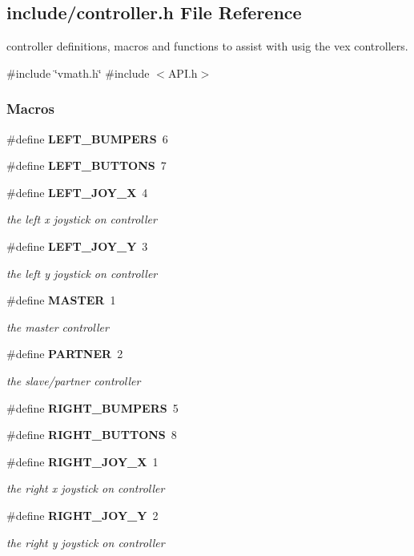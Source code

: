 \subsection{include/controller.h File Reference}
\label{a00011}


controller definitions, macros and functions to assist with usig the vex controllers.  


{\ttfamily \#include \char`\"{}vmath.\+h\char`\"{}}\newline
{\ttfamily \#include $<$A\+P\+I.\+h$>$}\newline
\subsubsection*{Macros}
\begin{DoxyCompactItemize}
\item 
\#define \textbf{ L\+E\+F\+T\+\_\+\+B\+U\+M\+P\+E\+RS}~6
\item 
\#define \textbf{ L\+E\+F\+T\+\_\+\+B\+U\+T\+T\+O\+NS}~7
\item 
\#define \textbf{ L\+E\+F\+T\+\_\+\+J\+O\+Y\+\_\+X}~4
\begin{DoxyCompactList}\small\item\em the left x joystick on controller \end{DoxyCompactList}\item 
\#define \textbf{ L\+E\+F\+T\+\_\+\+J\+O\+Y\+\_\+Y}~3
\begin{DoxyCompactList}\small\item\em the left y joystick on controller \end{DoxyCompactList}\item 
\#define \textbf{ M\+A\+S\+T\+ER}~1
\begin{DoxyCompactList}\small\item\em the master controller \end{DoxyCompactList}\item 
\#define \textbf{ P\+A\+R\+T\+N\+ER}~2
\begin{DoxyCompactList}\small\item\em the slave/partner controller \end{DoxyCompactList}\item 
\#define \textbf{ R\+I\+G\+H\+T\+\_\+\+B\+U\+M\+P\+E\+RS}~5
\item 
\#define \textbf{ R\+I\+G\+H\+T\+\_\+\+B\+U\+T\+T\+O\+NS}~8
\item 
\#define \textbf{ R\+I\+G\+H\+T\+\_\+\+J\+O\+Y\+\_\+X}~1
\begin{DoxyCompactList}\small\item\em the right x joystick on controller \end{DoxyCompactList}\item 
\#define \textbf{ R\+I\+G\+H\+T\+\_\+\+J\+O\+Y\+\_\+Y}~2
\begin{DoxyCompactList}\small\item\em the right y joystick on controller \end{DoxyCompactList}\end{DoxyCompactItemize}
